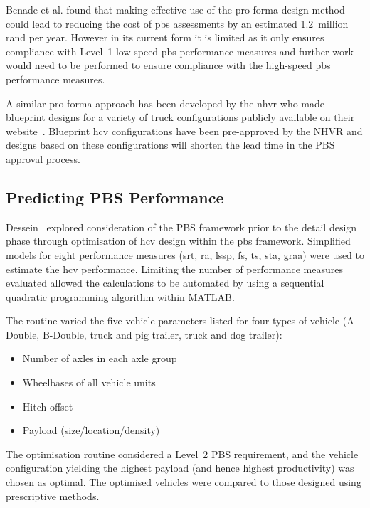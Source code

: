   Benade et al. found that making effective use of the pro-forma design method could lead to reducing the cost of \gls{pbs} assessments by an estimated 1.2~million rand \cite{Benade2015} per year. However in its current form it is limited as it only ensures compliance with Level~1 low-speed \gls{pbs} performance measures and further work would need to be performed to ensure compliance with the high-speed \gls{pbs} performance measures.

  A similar pro-forma approach has been developed by the \gls{nhvr} who made blueprint designs for a variety of truck configurations publicly available on their website~\cite{NationalHeavyVehicleRegulator}. Blueprint \gls{hcv} configurations have been pre-approved by the NHVR and designs based on these configurations will shorten the lead time in the PBS approval process.

\subsection{Predicting PBS Performance}\label{section:optimisation-of-vehicles-within-the-pbs-framework}

Dessein~\cite{Dessein2012} explored consideration of the PBS framework prior to the detail design phase through optimisation of \gls{hcv} design within the \gls{pbs} framework. Simplified models for eight performance measures (\gls{srt}, \gls{ra}, \gls{lssp}, \gls{fs}, \gls{ts}, \gls{sta}, \gls{graa}) were used to estimate the \gls{hcv} performance. Limiting the number of performance measures evaluated allowed the calculations to be automated by using a sequential quadratic programming algorithm within MATLAB.

The routine varied the five vehicle parameters listed for four types of vehicle (A-Double, B-Double, truck and pig trailer, truck and dog trailer):

\begin{itemize}
    \item Number of axles in each axle group
    \item Wheelbases of all vehicle units
    \item Hitch offset
    \item Payload (size/location/density)
\end{itemize}

The optimisation routine considered a Level~2 PBS requirement, and the vehicle configuration yielding the highest payload (and hence highest productivity) was chosen as optimal. The optimised vehicles were compared to those designed using prescriptive methods.

